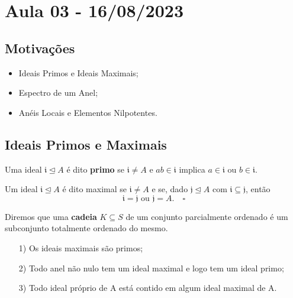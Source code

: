 \documentclass[algebraII_notes.tex]{subfiles}
\begin{document}
\section{Aula 03 - 16/08/2023}
\subsection{Motivações}
\begin{itemize}
	\item Ideais Primos e Ideais Maximais;
	\item Espectro de um Anel;
	\item Anéis Locais e Elementos Nilpotentes.
\end{itemize}
\subsection{Ideais Primos e  Maximais}
\begin{def*}
	Uma ideal \(\mathfrak{i} \trianglelefteq{A}\) é dito \textbf{primo} se \(\mathfrak{i}\neq A\) e \(ab\in \mathfrak{i}\)
	implica \(a\in \mathfrak{i}\) ou \(b\in \mathfrak{i}.\)

	Um ideal \(\mathfrak{i}\trianglelefteq{A}\) é dito maximal se \(\mathfrak{i}\neq A\) e se, dado \(\mathfrak{j}\trianglelefteq{A}\)
	com \(\mathfrak{i}\subseteq{\mathfrak{j}}\), então
	\[
		\mathfrak{i} = \mathfrak{j}\text{ ou } \mathfrak{j} = A.\quad\square
	\]
\end{def*}
Diremos que uma \textbf{cadeia} \(K\subseteq{S}\) de um conjunto parcialmente ordenado é um subconjunto totalmente
ordenado do mesmo.
\begin{prop*}
	\begin{itemize}
		\item[1)] Os ideais maximais são primos;
		\item[2)] Todo anel não nulo tem um ideal maximal e logo tem um ideal primo;
		\item[3)] Todo ideal próprio de A está contido em algum ideal maximal de A.
	\end{itemize}
\end{prop*}
\end{document}
